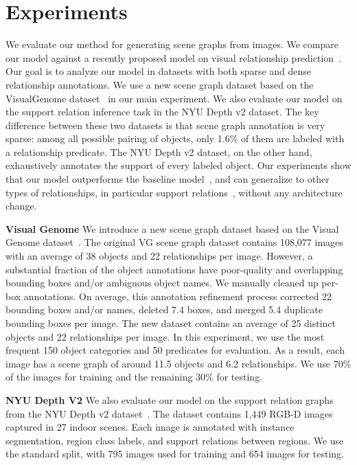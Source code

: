 \documentclass[10pt,twocolumn,letterpaper]{article}
\begin{document}
\section{Experiments}
\label{sec:experiment}
We evaluate our method for generating scene graphs from images. We compare our model
against a recently proposed model on visual relationship prediction~\cite{lu2016visual}. Our goal is to analyze our model in datasets with both sparse and dense relationship annotations. We use a new scene graph dataset based on the VisualGenome dataset~\cite{VG} in our main experiment. We also evaluate our model on the support relation inference task in the NYU Depth v2 dataset. The key difference between these two datasets is that scene graph annotation is very sparse: among all possible pairing of objects, only 1.6\% of them are labeled with a relationship predicate. The NYU Depth v2 dataset, on the other hand, exhaustively annotates the support of every labeled object.
Our experiments show that our model outperforms the baseline model~\cite{lu2016visual}, and can generalize to other types of relationships, in particular support relations~\cite{nyudepth}, without any architecture change.

\vspace{5pt}
\noindent\textbf{Visual Genome} We introduce a new scene graph dataset based on the Visual Genome dataset~\cite{VG}. The original VG scene graph dataset contains 108,077 images with an average of 38 objects and 22 relationships per image. However, a substantial fraction of the object annotations have poor-quality and overlapping bounding boxes and/or ambiguous object names. We manually cleaned up per-box annotations. On average, this annotation refinement process corrected 22 bounding boxes and/or names, deleted 7.4 boxes, and merged 5.4 duplicate bounding boxes per image. The new dataset contains an average of 25 distinct objects and 22 relationships per image.
In this experiment, we use the most frequent 150 object categories and 50 predicates for evaluation. As a result, each image has a scene graph of around 11.5 objects and 6.2 relationships.
We use 70\% of the images for training and the remaining 30\% for testing.

\vspace{5pt}
\noindent\textbf{NYU Depth V2} We also evaluate our model on the support relation graphs from the NYU Depth v2 dataset~\cite{nyudepth}. The dataset contains 1,449 RGB-D images captured in 27 indoor scenes. 
Each image is annotated with instance segmentation, region class labels, and support relations between regions. We use the standard split, with 795 images used for training and 654 images for testing.  
\end{document}
